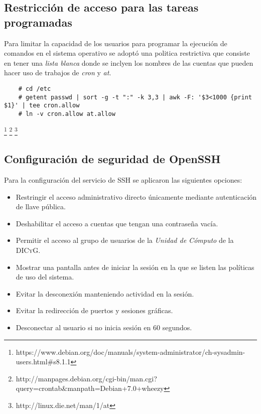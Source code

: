       \subsection {Restricci\'{o}n de acceso para las tareas programadas}

Para limitar la capacidad de los usuarios para programar la ejecuci\'{o}n de comandos en el sistema operativo se adopt\'{o} una politica restrictiva que consiste en tener una \textit{lista blanca} donde se inclyen los nombres de las cuentas que pueden hacer uso de trabajos de \textsl{cron} y \textsl{at}.

{
\scriptsize
\linespread{1}
\begin{verbatim}
    # cd /etc
    # getent passwd | sort -g -t ":" -k 3,3 | awk -F: '$3<1000 {print $1}' | tee cron.allow
    # ln -v cron.allow at.allow
\end{verbatim}
}
\footnote{https://www.debian.org/doc/manuals/system-administrator/ch-sysadmin-users.html\#s8.1.1}
\footnote{http://manpages.debian.org/cgi-bin/man.cgi?query=crontab\&manpath=Debian+7.0+wheezy}
\footnote{http://linux.die.net/man/1/at}

      \subsection {Configuraci\'{o}n de seguridad de OpenSSH}

Para la configuraci\'{o}n del servicio de \textsc{SSH} se aplicaron las siguientes opciones:

\begin{itemize}
  \item Restringir el acceso administrativo directo \'{u}nicamente mediante autenticaci\'{o}n de llave p\'{u}blica.
  \item Deshabilitar el acceso a cuentas que tengan una contrase\~{n}a vac\'{i}a.
  \item Permitir el acceso al grupo de usuarios de la \textit{Unidad de C\'{o}mputo} de la \textsc{DICyG}.
  \item  Mostrar una pantalla antes de iniciar la sesi\'{o}n en la que se listen las pol\'{i}ticas de uso del sistema.
  \item Evitar la desconexi\'{o}n manteniendo actividad en la sesi\'{o}n.
  \item Evitar la redirecci\'{o}n de puertos y sesiones gr\'{a}ficas.
  \item Desconectar al usuario si no inicia sesi\'{o}n en 60 segundos.
\end{itemize}


